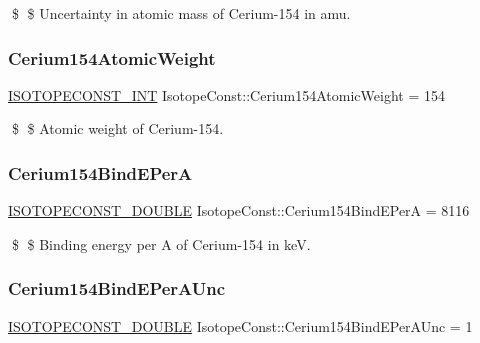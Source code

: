 \$ \$ Uncertainty in atomic mass of Cerium-\/154 in amu. \mbox{\label{group___isotope_const-_cerium-_ce154_gacd977611ecdf38995a8dfde9c7331bf0}} 
\subsubsection{\texorpdfstring{Cerium154\+Atomic\+Weight}{Cerium154AtomicWeight}}
{\footnotesize\ttfamily \mbox{\hyperlink{group___isotope_const-_macros_ga5f18360b3e99483a35c32d789e62621c}{I\+S\+O\+T\+O\+P\+E\+C\+O\+N\+S\+T\+\_\+\+I\+NT}} Isotope\+Const\+::\+Cerium154\+Atomic\+Weight = 154}

\$ \$ Atomic weight of Cerium-\/154. \mbox{\label{group___isotope_const-_cerium-_ce154_gab4a5ca35d5610097d81fd53d8a6ca7f9}} 
\subsubsection{\texorpdfstring{Cerium154\+Bind\+E\+PerA}{Cerium154BindEPerA}}
{\footnotesize\ttfamily \mbox{\hyperlink{group___isotope_const-_macros_ga8f45a7272ce02c0b4c65c44636ed719a}{I\+S\+O\+T\+O\+P\+E\+C\+O\+N\+S\+T\+\_\+\+D\+O\+U\+B\+LE}} Isotope\+Const\+::\+Cerium154\+Bind\+E\+PerA = 8116}

\$ \$ Binding energy per A of Cerium-\/154 in keV. \mbox{\label{group___isotope_const-_cerium-_ce154_gaf332e7a502fb4aab2de63c58dca5f581}} 
\subsubsection{\texorpdfstring{Cerium154\+Bind\+E\+Per\+A\+Unc}{Cerium154BindEPerAUnc}}
{\footnotesize\ttfamily \mbox{\hyperlink{group___isotope_const-_macros_ga8f45a7272ce02c0b4c65c44636ed719a}{I\+S\+O\+T\+O\+P\+E\+C\+O\+N\+S\+T\+\_\+\+D\+O\+U\+B\+LE}} Isotope\+Const\+::\+Cerium154\+Bind\+E\+Per\+A\+Unc = 1}

